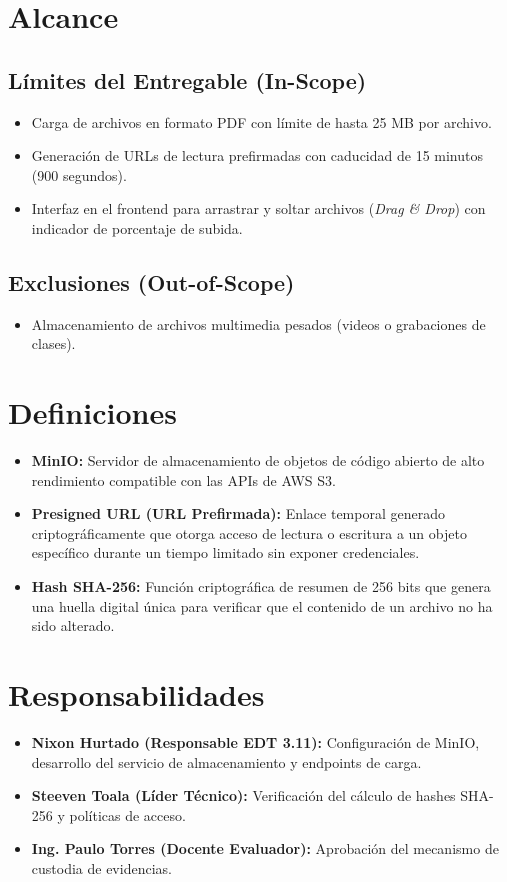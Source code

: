 \documentclass[12pt,a4paper]{article}
\begin{document}
\section{Alcance}
\subsection{Límites del Entregable (In-Scope)}
\begin{itemize}[leftmargin=1.5em, itemsep=2pt]
    \item Carga de archivos en formato PDF con límite de hasta 25 MB por archivo.
    \item Generación de URLs de lectura prefirmadas con caducidad de 15 minutos (900 segundos).
    \item Interfaz en el frontend para arrastrar y soltar archivos (\textit{Drag \& Drop}) con indicador de porcentaje de subida.
\end{itemize}
\subsection{Exclusiones (Out-of-Scope)}
\begin{itemize}[leftmargin=1.5em, itemsep=2pt]
    \item Almacenamiento de archivos multimedia pesados (videos o grabaciones de clases).
\end{itemize}

\section{Definiciones}
\begin{itemize}[leftmargin=1.5em, itemsep=2pt]
    \item \textbf{MinIO:} Servidor de almacenamiento de objetos de código abierto de alto rendimiento compatible con las APIs de AWS S3.
    \item \textbf{Presigned URL (URL Prefirmada):} Enlace temporal generado criptográficamente que otorga acceso de lectura o escritura a un objeto específico durante un tiempo limitado sin exponer credenciales.
    \item \textbf{Hash SHA-256:} Función criptográfica de resumen de 256 bits que genera una huella digital única para verificar que el contenido de un archivo no ha sido alterado.
\end{itemize}

\section{Responsabilidades}
\begin{itemize}[leftmargin=1.5em, itemsep=2pt]
    \item \textbf{Nixon Hurtado (Responsable EDT 3.11):} Configuración de MinIO, desarrollo del servicio de almacenamiento y endpoints de carga.
    \item \textbf{Steeven Toala (Líder Técnico):} Verificación del cálculo de hashes SHA-256 y políticas de acceso.
    \item \textbf{Ing. Paulo Torres (Docente Evaluador):} Aprobación del mecanismo de custodia de evidencias.
\end{itemize}
\end{document}
